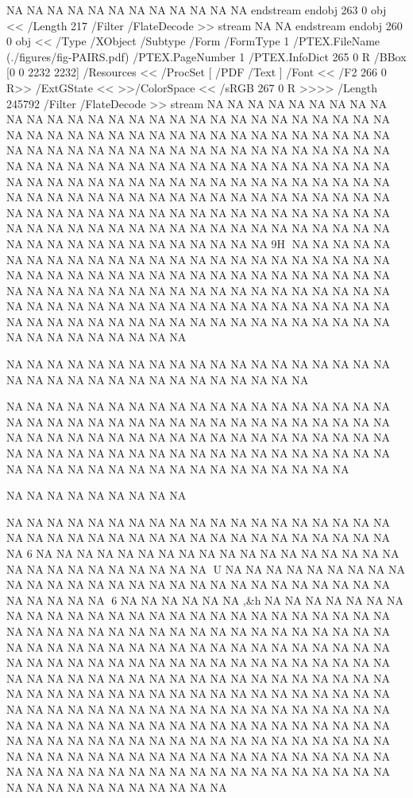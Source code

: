 NA
NA
NA
NA
NA
NA
NA
NA
NA
NA
NA
NA
endstream
endobj
263 0 obj <<
/Length 217       
/Filter /FlateDecode
>>
stream
NA
NA
endstream
endobj
260 0 obj <<
/Type /XObject
/Subtype /Form
/FormType 1
/PTEX.FileName (./figures/fig-PAIRS.pdf)
/PTEX.PageNumber 1
/PTEX.InfoDict 265 0 R
/BBox [0 0 2232 2232]
/Resources <<
/ProcSet [ /PDF /Text ]
/Font << /F2 266 0 R>>
/ExtGState <<
>>/ColorSpace <<
/sRGB 267 0 R
>>>>
/Length 245792
/Filter /FlateDecode
>>
stream
NA
NA
NA
NA
NA
NA
NA
NA
NA
NA
NA
NA
NA
NA
NA
NA
NA
NA
NA
NA
NA
NA
NA
NA
NA
NA
NA
NA
NA
NA
NA
NA
NA
NA
NA
NA
NA
NA
NA
NA
NA
NA
NA
NA
NA
NA
NA
NA
NA
NA
NA
NA
NA
NA
NA
NA
NA
NA
NA
NA
NA
NA
NA
NA
NA
NA
NA
NA
NA
NA
NA
NA
NA
NA
NA
NA
NA
NA
NA
NA
NA
NA
NA
NA
NA
NA
NA
NA
NA
NA
NA
NA
NA
NA
NA
NA
NA
NA
NA
NA
NA
NA
NA
NA
NA
NA
NA
NA
NA
NA
NA
NA
NA
NA
NA
NA
NA
NA
NA
NA
NA
NA
NA
NA
NA
NA
NA
NA
NA
NA
NA
NA
NA
NA
NA
NA
NA
NA
NA
NA
NA
NA
NA
NA
NA
NA
NA
NA
NA
NA
NA
NA
NA
NA
NA
NA
NA
NA
NA
NA
NA
NA
NA
NA
NA
NA
NA
NA
NA
NA
NA
NA
NA
NA
9H
NA
NA
NA
NA
NA
NA
NA
NA
NA
NA
NA
NA
NA
NA
NA
NA
NA
NA
NA
NA
NA
NA
NA
NA
NA
NA
NA
NA
NA
NA
NA
NA
NA
NA
NA
NA
NA
NA
NA
NA
NA
NA
NA
NA
NA
NA
NA
NA
NA
NA
NA
NA
NA
NA
NA
NA
NA
NA
NA
NA
NA
NA
NA
NA
NA
NA
NA
NA
NA
NA
NA
NA
NA
NA
NA
NA
NA
NA
NA
NA
NA
NA
NA
NA
NA
NA
NA
NA
NA
NA
NA
NA
NA
NA
NA
NA
NA
NA
NA
NA
NA
NA
NA
NA
NA
NA
NA
NA
NA

NA
NA
NA
NA
NA
NA
NA
NA
NA
NA
NA
NA
NA
NA
NA
NA
NA
NA
NA
NA
NA
NA
NA
NA
NA
NA
NA
NA
NA
NA
NA
NA
NA
NA

NA
NA
NA
NA
NA
NA
NA
NA
NA
NA
NA
NA
NA
NA
NA
NA
NA
NA
NA
NA
NA
NA
NA
NA
NA
NA
NA
NA
NA
NA
NA
NA
NA
NA
NA
NA
NA
NA
NA
NA
NA
NA
NA
NA
NA
NA
NA
NA
NA
NA
NA
NA
NA
NA
NA
NA
NA
NA
NA
NA
NA
NA
NA
NA
NA
NA
NA
NA
NA
NA
NA
NA
NA
NA
NA
NA
NA
NA
NA
NA
NA
NA
NA
NA
NA
NA
NA
NA
NA
NA
NA
NA
NA

NA
NA
NA
NA
NA
NA
NA
NA
NA

NA
NA
NA
NA
NA
NA
NA
NA
NA
NA
NA
NA
NA
NA
NA
NA
NA
NA
NA
NA
NA
NA
NA
NA
NA
NA
NA
NA
NA
NA
NA
NA
NA
NA
NA
NA
NA
NA
NA
6
NA
NA
NA
NA
NA
NA
NA
NA
NA
NA
NA
NA
NA
NA
NA
NA
NA
NA
NA
NA
NA
NA
NA
NA
NA
NA
NA
NA
U
NA
NA
NA
NA
NA
NA
NA
NA
NA
NA
NA
NA
NA
NA
NA
NA
NA
NA
NA
NA
NA
NA
NA
NA
NA
NA
NA
NA
NA
NA
NA
NA
NA
6
NA
NA
NA
NA
NA
NA
,&h
NA
NA
NA
NA
NA
NA
NA
NA
NA
NA
NA
NA
NA
NA
NA
NA
NA
NA
NA
NA
NA
NA
NA
NA
NA
NA
NA
NA
NA
NA
NA
NA
NA
NA
NA
NA
NA
NA
NA
NA
NA
NA
NA
NA
NA
NA
NA
NA
NA
NA
NA
NA
NA
NA
NA
NA
NA
NA
NA
NA
NA
NA
NA
NA
NA
NA
NA
NA
NA
NA
NA
NA
NA
NA
NA
NA
NA
NA
NA
NA
NA
NA
NA
NA
NA
NA
NA
NA
NA
NA
NA
NA
NA
NA
NA
NA
NA
NA
NA
NA
NA
NA
NA
NA
NA
NA
NA
NA
NA
NA
NA
NA
NA
NA
NA
NA
NA
NA
NA
NA
NA
NA
NA
NA
NA
NA
NA
NA
NA
NA
NA
NA
NA
NA
NA
NA
NA
NA
NA
NA
NA
NA
NA
NA
NA
NA
NA
NA
NA
NA
NA
NA
NA
NA
NA
NA
NA
NA
NA
NA
NA
NA
NA
NA
NA
NA
NA
NA
NA
NA
NA
NA
NA
NA
NA
NA
NA
NA
NA
NA
NA
NA
NA
NA
NA
NA
NA
NA
NA
NA
NA
NA
NA
NA
NA
NA
NA
NA
NA
NA
NA
NA
NA
NA
NA
NA
NA
NA
NA
NA
NA
NA
NA
NA
NA
NA
NA
NA
NA
NA
NA
NA
NA
NA
NA
NA
NA

